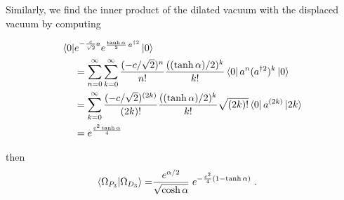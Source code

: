 \documentclass[%
 reprint,
superscriptaddress,
 amsmath,amssymb,
 aps,
]{revtex4-2}
\begin{document}
Similarly, we find the inner product of the dilated vacuum with
the displaced vacuum by computing

\begin{align}
    \bra{0}&e^{-\frac{c}{\sqrt{2}}a} e^{\frac{\tanh\alpha}{2}\,a^{\dagger2}}\ket{0}\nonumber\\
    &=\sum_{n=0}^{\infty}\sum_{k=0}^{\infty}\frac{(-c/\sqrt{2})^n}{n!}\frac{((\tanh\alpha)/2)^k}{k!}\bra{0}a^n (a^{\dagger2})^k\ket{0}\nonumber\\
    &=\sum_{k=0}^{\infty}\frac{(-c/\sqrt{2})^{(2k)}}{(2k)!}\frac{((\tanh\alpha)/2)^k}{k!}\sqrt{(2k)!}\bra{0}a^{(2k)} \ket{2k}\nonumber\\
    &=e^{\frac{c^2\tanh\alpha}{4}}
\end{align}

then
\begin{align}
    \braket{\Omega_{P_{3}}|\Omega_{D_{3}}} =& \frac{e^{\alpha/2}}{\sqrt{\cosh\alpha}}\; e^{-\frac{c^2}{4}(1-\tanh\alpha)}~.
\end{align}
\end{document}
